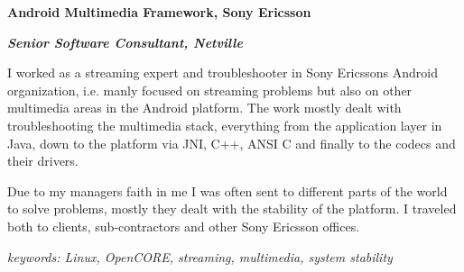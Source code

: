 \item[2009-2010] \textbf{Android Multimedia Framework, Sony Ericsson}

\textit{\textbf{Senior Software Consultant, Netville}}

I worked as a streaming expert and troubleshooter in Sony Ericssons Android organization, i.e. manly focused on streaming problems but also on other multimedia areas in the Android platform. The work mostly dealt with troubleshooting the multimedia stack, everything from the application layer in Java, down to the platform via JNI, C++, ANSI C and finally to the codecs and their drivers.

Due to my managers faith in me I was often sent to different parts of the world to solve problems, mostly they dealt with the stability of the platform. I traveled both to clients, sub-contractors and other Sony Ericsson offices.

\textit{keywords: Linux, OpenCORE, streaming, multimedia, system stability}